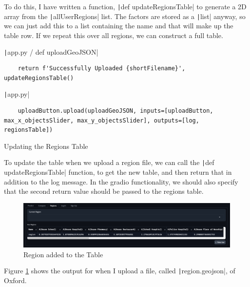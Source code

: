 \documentclass[12pt]{report}
\newcommand{\pil}[1]{\protect\texttt|#1|}
\begin{document}
To do this, I have written a function, \pil{def updateRegionsTable} to generate a 2D array from the \pil{allUserRegions} list. The factors are stored as a \pil{list} anyway, so we can just add this to a list containing the name and that will make up the table row. If we repeat this over all regions, we can construct a full table.

\begin{listing}[H]
\pil{app.py / def uploadGeoJSON}
\begin{verbatim}
    return f'Successfully Uploaded {shortFilename}', updateRegionsTable()
\end{verbatim}
\pil{app.py}
\begin{verbatim}
    uploadButton.upload(uploadGeoJSON, inputs=[uploadButton, max_x_objectsSlider, max_y_objectsSlider], outputs=[log, regionsTable])
\end{verbatim}
\caption{Updating the Regions Table}\label{cs:updateRegionsTable}
\end{listing}

To update the table when we upload a region file, we can call the \pil{def updateRegionsTable} function, to get the new table, and then return that in addition to the log message. In the gradio functionality, we should also specify that the second return value should be passed to the regions table.

\begin{figure}[H]
\centering
\includegraphics[width=14cm]{ss20.3.png}
\caption{Region added to the Table}\label{fig:ss20.3}
\end{figure}

Figure \ref{fig:ss20.3} shows the output for when I upload a file, called \pil{region.geojson}, of Oxford.

\begin{center}
\end{center}
\end{document}
